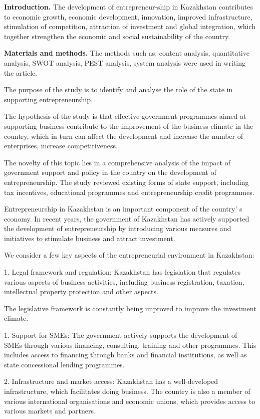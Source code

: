 \begin{multicols}{2}
{\bfseries Introduction.} The development of entrepreneur-ship in Kazakhstan
contributes to economic growth, economic development, innovation,
improved infrastructure, stimulation of competition, attraction of
investment and global integration, which together strengthen the
economic and social sustainability of the country.

{\bfseries Materials and methods.} The methods such as: content analysis,
quantitative analysis, SWOT analysis, PEST analysis, system analysis
were used in writing the article.

The purpose of the study is to identify and analyse the role of the
state in supporting entrepreneurship.

The hypothesis of the study is that effective government programmes
aimed at supporting business contribute to the improvement of the
business climate in the country, which in turn can affect the
development and increase the number of enterprises, increase
competitiveness.

The novelty of this topic lies in a comprehensive analysis of the impact
of government support and policy in the country on the development of
entrepreneurship. The study reviewed existing forms of state support,
including tax incentives, educational programmes and entrepreneurship
credit programmes.

Entrepreneurship in Kazakhstan is an important component of the
country' s economy. In recent years, the government of
Kazakhstan has actively supported the development of entrepreneurship by
introducing various measures and initiatives to stimulate business and
attract investment.

We consider a few key aspects of the entrepreneurial environment in
Kazakhstan:

1. Legal framework and regulation: Kazakhstan has legislation that
regulates various aspects of business activities, including business
registration, taxation, intellectual property protection and other
aspects.

The legislative framework is constantly being improved to improve the
investment climate.

1. Support for SMEs: The government actively supports the development of
SMEs through various financing, consulting, training and other
programmes. This includes access to financing through banks and
financial institutions, as well as state concessional lending
programmes.

2. Infrastructure and market access: Kazakhstan has a well-developed
infrastructure, which facilitates doing business. The country is also
a member of various international organisations and economic unions,
which provides access to various markets and partners.


\end{multicols}

